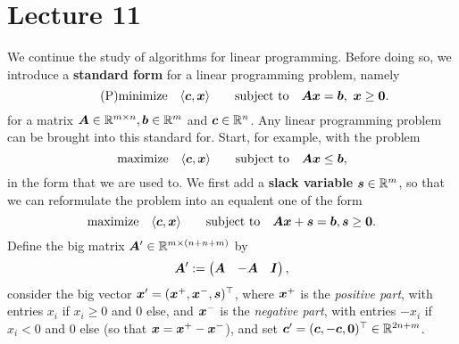 %
%
% 


\chapter*{Lecture 11}
\addtocounter{chapter}{1}
\addtocounter{section}{0}


We continue the study of algorithms for linear programming. Before doing so, we introduce a \textbf{standard form} for a linear programming problem, namely
\begin{equation}\label{eq:standard}\tag{P}
 \minimize \ip{\vct{c}}{\vct{x}} \quad \subjto \mtx{A}\vct{x}=\vct{b}, \ \vct{x}\geq \zerovct.
\end{equation}
for a matrix $\bm{A}\in \mathbb{R}^{m\times n}, \bm{b}\in \mathbb{R}^m$ and $\bm{c}\in \mathbb{R}^n$.
Any linear programming problem can be brought into this standard for. Start, for example, with
the problem
\begin{equation}\label{eq:old}
 \text{maximize}\quad \langle {\bm{c}}, {\bm{x}} \rangle \quad \quad\text{subject to}\quad \bm{A}\bm{x}\leq \bm{b},
\end{equation}
in the form that we are used to. We first add a \textbf{slack variable} $\bm{s}\in \mathbb{R}^m$, so that we can reformulate the problem into an equalent one of the form
\begin{equation}\label{eq:old}
 \text{maximize}\quad \langle {\bm{c}}, {\bm{x}} \rangle \quad \quad\text{subject to}\quad \bm{A}\bm{x}+\bm{s} = \bm{b}, \bm{s}\geq \bm{0}.
\end{equation}
Define the big matrix $\bm{A}'\in \mathbb{R}^{m\times (n+n+m)}$ by
\begin{equation*}
 \bm{A}' := \begin{pmatrix} \bm{A} & - \bm{A} & \bm{I} \end{pmatrix}, 
\end{equation*}
consider the big vector $\bm{x}' = (\bm{x}^+,\bm{x}^-,\bm{s})^{\top}$, where $\bm{x}^+$ is the {\em positive part}, with entries $x_i$ if $x_i\geq 0$ and $0$ else, and $\bm{x}^-$ is the {\em negative part}, with entries $-x_i$ if $x_i<0$ and $0$ else (so that $\bm{x}=\bm{x}^+-\bm{x}^-$), and set $\bm{c}'= (\bm{c},-\bm{c},\bm{0})^{\top}\in \mathbb{R}^{2n+m}$.

